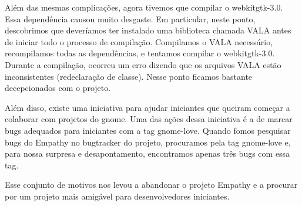 Além das mesmas complicações, agora tivemos que compilar o webkitgtk-3.0.
Essa dependência causou muito desgaste. Em particular, neste ponto, descobrimos
que deveríamos ter instalado uma biblioteca chamada VALA antes de iniciar todo o
processo de compilação.
Compilamos o VALA necessário, recompilamos todas as dependências, e tentamos
compilar o webkitgtk-3.0. Durante a compilação, ocorreu um erro dizendo que os
arquivos VALA estão inconsistentes (redeclaração de classe). Nesse ponto ficamos
bastante decepcionados com o projeto.

Além disso, existe uma iniciativa para ajudar iniciantes que queiram começar
a colaborar com projetos do gnome. Uma das ações dessa iniciativa é a de marcar
bugs adequados para iniciantes com a tag gnome-love. Quando fomos pesquisar bugs
do Empathy no bugtracker do projeto, procuramos pela tag gnome-love e, para
nossa surpresa e desapontamento, encontramos apenas três bugs com essa tag.

Esse conjunto de motivos nos levou a abandonar o projeto Empathy e a procurar
por um projeto mais amigável para desenvolvedores iniciantes.
